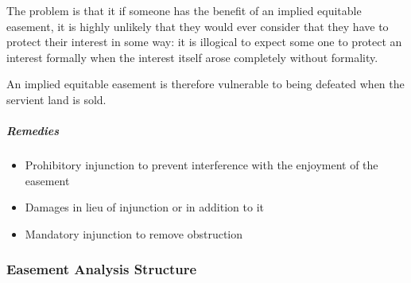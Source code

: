 \documentclass[
]{article}
\providecommand{\tightlist}{%
  \setlength{\itemsep}{0pt}\setlength{\parskip}{0pt}}
\begin{document}
The problem is that it if someone has the benefit of an implied
equitable easement, it is highly unlikely that they would ever consider
that they have to protect their interest in some way: it is illogical to
expect some one to protect an interest formally when the interest itself
arose completely without formality.

An implied equitable easement is therefore vulnerable to being defeated
when the servient land is sold.

\hypertarget{remedies-1}{%
\subparagraph{Remedies}\label{remedies-1}}

\begin{itemize}
\tightlist
\item
  Prohibitory injunction to prevent interference with the enjoyment of
  the easement
\item
  Damages in lieu of injunction or in addition to it
\item
  Mandatory injunction to remove obstruction
\end{itemize}

\hypertarget{easement-analysis-structure}{%
\subsubsection{Easement Analysis
Structure}\label{easement-analysis-structure}}
\end{document}
